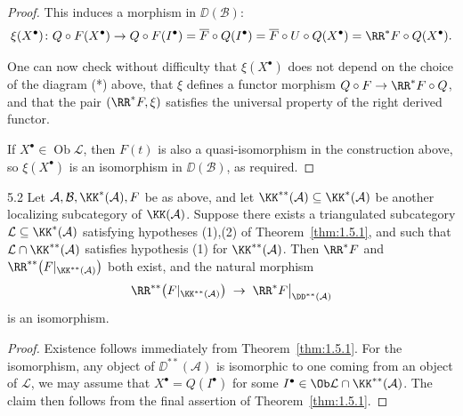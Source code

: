 \begin{proof}
This induces a morphism in $\DD(\mathcal{B})$:
\[
\xi(X^\bullet)\colon Q\circ F(X^\bullet)
\to Q\circ F(I^\bullet)
= \overline{F}\circ Q(I^\bullet)
= \overline{F}\circ U\circ Q(X^\bullet)
= \RR^*F\circ Q(X^\bullet).
\]

One can now check without difficulty that $\xi(X^\bullet)$  does not depend on
the choice of the diagram (*) above, that $\xi$ defines a functor morphism $Q\circ F\to \RR^*F\circ Q$, and that the pair $(\RR^*F,\xi)$ satisfies the universal property of the right derived functor.

If $X^\bullet\in\operatorname{Ob}\mathcal{L}$, then $F(t)$ is also a quasi-isomorphism in the construction above, so $\xi(X^\bullet)$ is an isomorphism in $\DD(\mathcal{B})$, as required.
\end{proof}

\begin{bookproposition}{5.2}\label{prop:1.5.2}
Let $\mathcal{A},\mathcal{B},\KK^*(\mathcal{A}),F$ be as above, and let $\KK^{**}(\mathcal{A})\subseteq\KK^*(\mathcal{A})$ be another localizing subcategory of $\KK(\mathcal{A})$. Suppose there exists a triangulated subcategory $\mathcal{L}\subseteq\KK^*(\mathcal{A})$ satisfying hypotheses (1),(2) of Theorem~\ref{thm:1.5.1}, and such that $\mathcal{L}\cap\KK^{**}(\mathcal{A})$ satisfies hypothesis (1) for $\KK^{**}(\mathcal{A})$.
Then  $\RR^*F$ and $\RR^{**}\big(F|_{\KK^{**}(\mathcal{A})}\big)$ both exist, and the natural morphism
\[
\RR^{**}\big(F|_{\KK^{**}(\mathcal{A})}\big)
\;\to\;
\RR^*F\big|_{\DD^{**}(\mathcal{A})}
\]
is an isomorphism.
\end{bookproposition}

\begin{proof}
Existence follows immediately from Theorem~\ref{thm:1.5.1}. For the isomorphism, any object of $\DD^{**}(\mathcal{A})$ is isomorphic to one coming from an object of $\mathcal{L}$, we may assume that $X^\bullet=Q(I^\bullet)$ for some $I^\bullet\in\Ob \mathcal{L}\cap\KK^{**}(\mathcal{A})$. The claim then follows from the final assertion of Theorem~\ref{thm:1.5.1}.
\end{proof}

